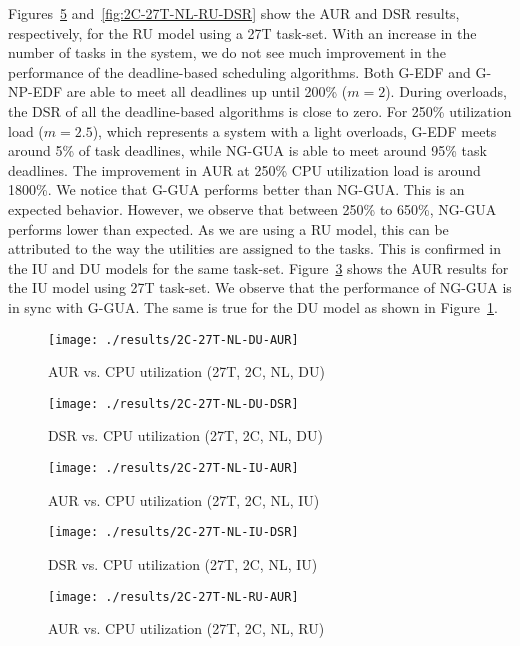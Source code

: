 \documentclass[12pt,dvips]{report}
\begin{document}
Figures~\ref{fig:2C-27T-NL-RU-AUR} and~\ref{fig:2C-27T-NL-RU-DSR} show the AUR and DSR results, respectively, for the RU model using a 27T task-set. With an increase in the number of tasks in the system, we do not see much improvement in the performance of the deadline-based scheduling algorithms. Both G-EDF and G-NP-EDF are able to meet all deadlines up until 200\% ($m=2$). During overloads, the DSR of all the deadline-based algorithms is close to zero. For 250\% utilization load ($m=2.5$), which represents a system with a light overloads, G-EDF meets around 5\% of task deadlines, while NG-GUA is able to meet around 95\% task deadlines. The improvement in AUR at 250\% CPU utilization load is around 1800\%. We notice that G-GUA performs better than NG-GUA. This is an expected behavior. However, we observe that between 250\% to 650\%, NG-GUA performs lower than expected. As we are using a RU model, this can be attributed to the way the utilities are assigned to the tasks. This is confirmed in the IU and DU models for the same task-set. Figure~\ref{fig:2C-27T-NL-IU-AUR} shows the AUR results for the IU model using 27T task-set. We observe that the performance of NG-GUA is in sync with G-GUA. The same is true for the DU model as shown in Figure~\ref{fig:2C-27T-NL-DU-AUR}.
 
\begin{figure} [htbp]
  \centering
  \texttt{[image: ./results/2C-27T-NL-DU-AUR]}
  \caption{AUR vs. CPU utilization (27T, 2C, NL, DU)}
  \label{fig:2C-27T-NL-DU-AUR}
\end{figure}
 
  
\begin{figure} [htbp]
  \centering
  \texttt{[image: ./results/2C-27T-NL-DU-DSR]}
  \caption{DSR vs. CPU utilization (27T, 2C, NL, DU)}
  \label{fig:2C-27T-NL-DU-DSR}
\end{figure}
  
 
\begin{figure} [htbp]
  \centering
  \texttt{[image: ./results/2C-27T-NL-IU-AUR]}
  \caption{AUR vs. CPU utilization (27T, 2C, NL, IU)}
  \label{fig:2C-27T-NL-IU-AUR}
\end{figure}
 
\begin{figure} [htbp]
  \centering
  \texttt{[image: ./results/2C-27T-NL-IU-DSR]}
  \caption{DSR vs. CPU utilization (27T, 2C, NL, IU)}
  \label{fig:2C-27T-NL-IU-DSR}
\end{figure}
 
\begin{figure} [htbp]
  \centering
  \texttt{[image: ./results/2C-27T-NL-RU-AUR]}
  \caption{AUR vs. CPU utilization (27T, 2C, NL, RU)}
  \label{fig:2C-27T-NL-RU-AUR}
\end{figure}
 
\end{document}
